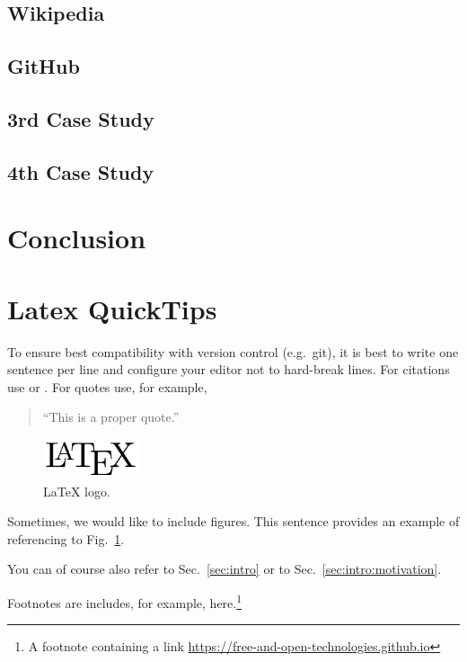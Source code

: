 \documentclass[a4paper, 11pt]{article}
\begin{document}
\subsection{Wikipedia} \label{sec:casestudies:wikipedia}

\subsection{GitHub} \label{sec:casestudies:github}

\subsection{3rd Case Study}

\subsection{4th Case Study}

\section{Conclusion} \label{sec:conclusion}




\doclicenseThis

\section{Latex QuickTips} \label{sec:tips}

To ensure best compatibility with version control (e.g.\ git), it is best to write one sentence per line and configure your editor not to hard-break lines.
For citations use \cite{terrell-gender-bias} or \cite[p.\ 6--8]{terrell-gender-bias}.
For quotes use, for example,
\begin{quote}
	``This is a proper quote.'' 
\end{quote}

\begin{figure}[t]
	\centering
	\includegraphics[width=0.25\textwidth]{figures/logo.png}
\caption{LaTeX logo.} \label{fig:logo}
\end{figure}

Sometimes, we would like to include figures.
This sentence provides an example of referencing to Fig.~\ref{fig:logo}.

You can of course also refer to Sec.~\ref{sec:intro} or to Sec.~\ref{sec:intro:motivation}.

Footnotes are includes, for example, here.\footnote{A footnote containing a link \url{https://free-and-open-technologies.github.io}}
\end{document}
